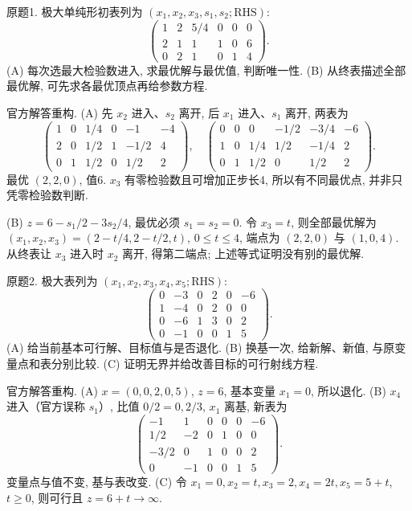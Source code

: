 \begin{exercise}\label{ass:15053-rec3-q1}
原题1. 极大单纯形初表列为 $(x_1,x_2,x_3,s_1,s_2;\mathrm{RHS})$:
\[
\begin{pmatrix}1&2&5/4&0&0&0\\2&1&1&1&0&6\\0&2&1&0&1&4\end{pmatrix}.
\]
(A) 每次选最大检验数进入, 求最优解与最优值, 判断唯一性. (B) 从终表描述全部最优解, 可先求各最优顶点再给参数方程.
\end{exercise}
\begin{solution}
官方解答重构. (A) 先 $x_2$ 进入、$s_2$ 离开, 后 $x_1$ 进入、$s_1$ 离开, 两表为
\[
\begin{pmatrix}1&0&1/4&0&-1&-4\\2&0&1/2&1&-1/2&4\\0&1&1/2&0&1/2&2\end{pmatrix},\quad
\begin{pmatrix}0&0&0&-1/2&-3/4&-6\\1&0&1/4&1/2&-1/4&2\\0&1&1/2&0&1/2&2\end{pmatrix}.
\]
最优 $(2,2,0)$, 值6. $x_3$ 有零检验数且可增加正步长4, 所以有不同最优点, 并非只凭零检验数判断.

(B) $z=6-s_1/2-3s_2/4$, 最优必须 $s_1=s_2=0$. 令 $x_3=t$, 则全部最优解为 $(x_1,x_2,x_3)=(2-t/4,2-t/2,t)$, $0\le t\le4$, 端点为 $(2,2,0)$ 与 $(1,0,4)$. 从终表让 $x_3$ 进入时 $x_2$ 离开, 得第二端点; 上述等式证明没有别的最优解.
\end{solution}

\begin{exercise}\label{ass:15053-rec3-q2}
原题2. 极大表列为 $(x_1,x_2,x_3,x_4,x_5;\mathrm{RHS})$:
\[
\begin{pmatrix}0&-3&0&2&0&-6\\1&-4&0&2&0&0\\0&-6&1&3&0&2\\0&-1&0&0&1&5\end{pmatrix}.
\]
(A) 给当前基本可行解、目标值与是否退化. (B) 换基一次, 给新解、新值, 与原变量点和表分别比较. (C) 证明无界并给改善目标的可行射线方程.
\end{exercise}
\begin{solution}
官方解答重构. (A) $x=(0,0,2,0,5)$, $z=6$, 基本变量 $x_1=0$, 所以退化. (B) $x_4$ 进入（官方误称 $s_1$）, 比值 $0/2=0,2/3$, $x_1$ 离基, 新表为
\[
\begin{pmatrix}-1&1&0&0&0&-6\\1/2&-2&0&1&0&0\\-3/2&0&1&0&0&2\\0&-1&0&0&1&5\end{pmatrix}.
\]
变量点与值不变, 基与表改变. (C) 令 $x_1=0,x_2=t,x_3=2,x_4=2t,x_5=5+t$, $t\ge0$, 则可行且 $z=6+t\to\infty$.
\end{solution}


